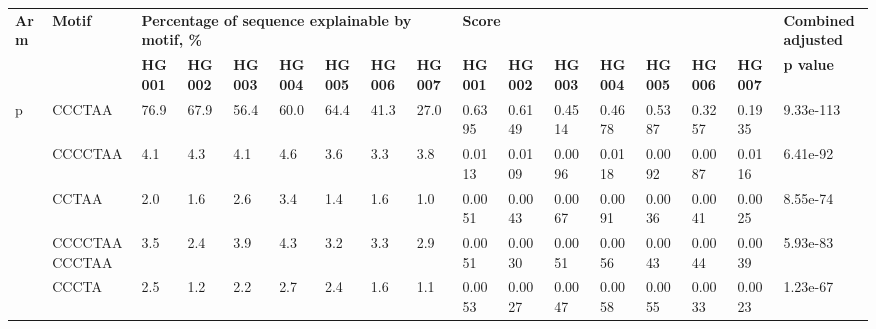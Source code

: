 \begin{landscape} \begin{samepage} \begin{table}[h!] \scriptsize \begin{tabular}{lllllllllllllllll}
\hline
\textbf{Arm} & \textbf{Motif} & \multicolumn{7}{l}{\textbf{Percentage of sequence explainable by motif, \%}}                                         & \multicolumn{7}{l}{\textbf{Score}}                                                                                   & \textbf{Combined adjusted} \\
\textbf{}    & \textbf{}      & \textbf{HG001} & \textbf{HG002} & \textbf{HG003} & \textbf{HG004} & \textbf{HG005} & \textbf{HG006} & \textbf{HG007} & \textbf{HG001} & \textbf{HG002} & \textbf{HG003} & \textbf{HG004} & \textbf{HG005} & \textbf{HG006} & \textbf{HG007} & \textbf{p value}           \\
\hline
p            & CCCTAA         & 76.9           & 67.9           & 56.4           & 60.0           & 64.4           & 41.3           & 27.0           & 0.6395         & 0.6149         & 0.4514         & 0.4678         & 0.5387         & 0.3257         & 0.1935         & 9.33e-113                  \\
\textbf{}    & CCCCTAA        & 4.1            & 4.3            & 4.1            & 4.6            & 3.6            & 3.3            & 3.8            & 0.0113         & 0.0109         & 0.0096         & 0.0118         & 0.0092         & 0.0087         & 0.0116         & 6.41e-92                   \\
\textbf{}    & CCTAA          & 2.0            & 1.6            & 2.6            & 3.4            & 1.4            & 1.6            & 1.0            & 0.0051         & 0.0043         & 0.0067         & 0.0091         & 0.0036         & 0.0041         & 0.0025         & 8.55e-74                   \\
\textbf{}    & CCCCTAACCCTAA  & 3.5            & 2.4            & 3.9            & 4.3            & 3.2            & 3.3            & 2.9            & 0.0051         & 0.0030         & 0.0051         & 0.0056         & 0.0043         & 0.0044         & 0.0039         & 5.93e-83                   \\
\textbf{}    & CCCTA          & 2.5            & 1.2            & 2.2            & 2.7            & 2.4            & 1.6            & 1.1            & 0.0053         & 0.0027         & 0.0047         & 0.0058         & 0.0055         & 0.0033         & 0.0023         & 1.23e-67                   \\

\end{tabular}
\end{table}
\end{samepage}
\end{landscape}
